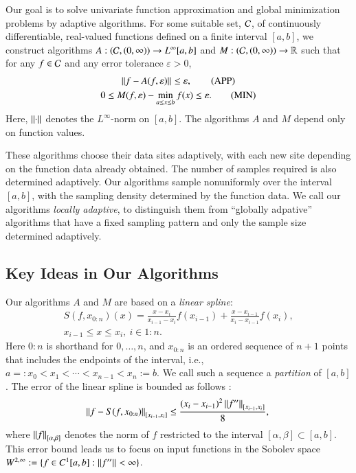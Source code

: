 \documentclass[review]{elsarticle}
\newcommand{\abstol}{\varepsilon}
\newcommand{\oton}{1\!:\!n}
\newcommand{\datasites}{x_{0:n}}
\theoremstyle{definition}
\renewcommand{\cw}{W}
\begin{document}
Our goal is to solve univariate function approximation and
global minimization problems by adaptive algorithms. For some suitable
set, $\cc$, of continuously differentiable, real-valued functions defined on a finite interval
$[a,b]$, we construct algorithms $A:(\cc,(0,\infty)) \to L^{\infty}[a,b]$ and
$M: (\cc,(0,\infty)) \to \reals$ such that for any $f \in \cc$ and any error
tolerance $\abstol > 0$,
\begin{gather}
\norm{f - A(f,\abstol)} \le \abstol,  \tag{APP} \label{appxprob} \\
0 \le M(f,\abstol) - \min_{a \le x \le b} f(x)  \le \abstol. \tag{MIN} \label{optprob}
\end{gather}
Here, $\norm{\cdot}$ denotes the $L^{\infty}$-norm on $[a,b]$. The algorithms
$A$ and $M$ depend only on function values.

These algorithms choose their data
sites adaptively, with each new site depending on the function
data already obtained. The number of samples required is also determined adaptively.  Our algorithms sample nonuniformly over the interval $[a,b]$, with the sampling density determined by the function data.  We call our algorithms \emph{locally adaptive}, to distinguish them from ``globally adpative'' algorithms that have a fixed sampling pattern and only the sample size determined adaptively.

\subsection{Key Ideas in Our Algorithms} \label{subsec:keyideas}
Our algorithms $A$ and $M$ are based on a \emph{linear spline}: 
\begin{multline} \label{splinedef}
S(f,\datasites)(x) =  \frac{x-x_i}{x_{i-1} - x_i} f(x_{i-1}) + \frac{x-x_{i-1}}{x_{i} - x_{i-1}}f(x_i), \\ x_{i-1} \le x \le x_i, \ i \in \oton.
\end{multline}
Here ${0\!:\!n}$ is shorthand for ${0, \ldots, n}$, and  $\datasites$ is an ordered sequence of $n+1$ points that includes the endpoints of the interval, i.e., $a=:x_0 <x_1 < \cdots < x_{n-1} < x_{n}:=b$.   We call such a sequence a \emph{partition} of $[a,b]$.  The error of the linear spline is bounded as follows \cite[Theorem
3.3]{BurFaiBur16a}:
\begin{equation} \label{appxerrbda}
	\norm[{[x_{i-1},x_i]}]{f - S(f,\datasites)} \le \frac{(x_i - x_{i-1})^2\norm[{[x_{i-1},x_i]}]{f''}}{8}, \\
\end{equation}
where $\norm[{[\alpha,\beta]}]{f}$ denotes the norm of $f$ restricted to the interval $[\alpha,\beta] \subset [a,b]$.  This error bound leads us to focus on input functions in the Sobolev space $\cw^{2,\infty} :=  \{f \in C^1[a,b] : \norm{f''}  <  \infty \}$.
\end{document}
